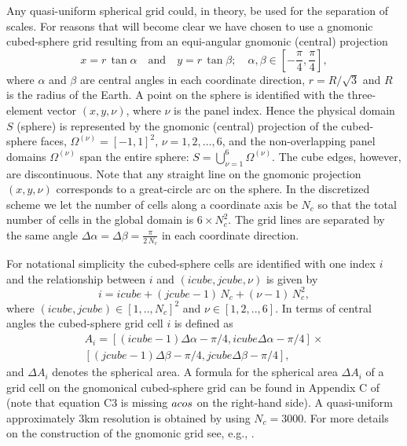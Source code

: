 \documentclass[gmd]{copernicus}
\begin{document}
Any quasi-uniform spherical grid could, in theory, be used for the separation of scales. For reasons that will become clear we have chosen to use a gnomonic cubed-sphere grid resulting from an  equi-angular gnomonic (central) projection
\begin{equation}
\label{eq:GnomonicCoordinates}
x=r \, \tan \alpha \quad \mbox{and} \quad y=r \, \tan \beta; \quad
    \alpha,\beta \in \left[ -\frac{\pi}{4},\frac{\pi}{4}\right],
\end{equation}
%
%
\citep{RIP1996JCP} where $\alpha$ and $\beta$ are central angles in each coordinate direction, $r=R/\sqrt{3}$ and $R$ is the radius of the Earth. A point on the sphere is identified with the three-element vector $(x,y,\nu)$, where $\nu$ is the panel index. Hence the physical domain $S$ (sphere) is represented by the gnomonic (central) projection of the cubed-sphere faces, $\Omega^{(\nu)}=[-1,1]^2$, $\nu = 1,2,\dots,6$, and the non-overlapping panel domains $\Omega^{(\nu)}$ span the entire sphere: $S=\bigcup_{\nu=1}^6\Omega^{(\nu)}$. The cube  edges, however, are discontinuous. Note that any straight line on the gnomonic projection $(x,y,\nu)$  corresponds to a great-circle arc on the sphere. In the discretized scheme we let the number of cells along a coordinate axis be $N_c$ so that the total number of cells in the global domain is $6\times N_c^2$. The grid lines are separated by the same angle $\Delta \alpha=\Delta \beta=\tfrac{\pi}{2\, N_c}$ in each coordinate direction.

For notational simplicity the cubed-sphere cells are identified with one index $i$ and the relationship between $i$ and $(icube,jcube,\nu)$ is given by 
\begin{equation}
i=icube+(jcube-1)\, N_c+(\nu-1)\, N_c^2,
\end{equation}
where $(icube,jcube)\in [1,..,N_c]^2$ and $\nu \in [1,2,..,6]$. In terms of central angles the cubed-sphere grid cell $i$ is defined as
\begin{multline}
A_i= [(icube-1)\Delta \alpha-\pi/4,icube\Delta \alpha-\pi/4]\times\\
 [(jcube-1)\Delta \beta-\pi/4,jcube\Delta \beta-\pi/4],
\end{multline}
and $\Delta A_i$ denotes the spherical area. A formula for the spherical area $\Delta A_i$ of a grid cell on the gnomonical cubed-sphere grid can be found in Appendix C of \citet{LN2008MWR} (note that equation C3 is missing $\\acos$ on the right-hand side). A quasi-uniform approximately 3km resolution is obtained by using $N_c=3000$. For more details on the construction of the gnomonic grid see, e.g., \cite{LNU2010JCP}.
%
%
%
\end{document}
